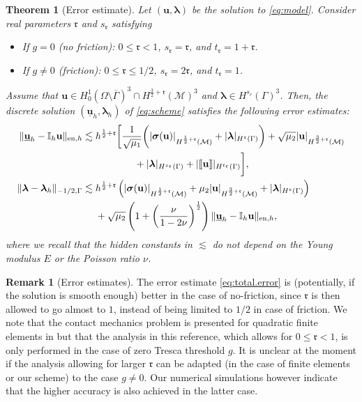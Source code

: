 \documentclass[a4paper,11pt]{article}
\newtheorem{theorem}{Theorem}[section]
\theoremstyle{definition}
\newtheorem{remark}{Remark}[section]
\theoremstyle{remark}
\newcommand{\uvec}[1]{\underline{\mathbf{#1}}}
\newcommand{\bo}[1]{\mathbf{#1}}
\newcommand{\bos}[1]{\boldsymbol{#1}}
\newcommand{\mI}[1]{\mathbb I_h\bo{#1}}
\def\cM{\mathcal{M}}
\def\fr{\mathfrak{r}}
\def\blambda{\boldsymbol{\lambda}}
\def\sjump#1{[\hskip -1.5pt[#1]\hskip -1.5pt]}
\def\O{\Omega}
\begin{document}
\begin{theorem}[Error estimate]\label{thm:error.estimate}
Let $(\bo{u},\blambda)$ be the solution to \eqref{eq:model}. Consider real parameters $\fr$ and $s_{\fr}$ satisfying
\begin{itemize}
\item If $g=0$ (no friction): $0\le \fr<1$, $s_{\fr}=\fr$, and $t_{\fr} =1+\fr$. 

\item If $g\not=0$ (friction): $0\le\fr\le 1/2$, $s_{\fr}=2\fr$, and $t_{\fr}=1$.
\end{itemize}
Assume that $\bo{u}\in H^1_0(\O\setminus\overline{\Gamma})^3\cap H^{\frac{3}{2}+\fr}(\cM)^3$ and $\blambda\in H^{s_r}(\Gamma)^3$. Then, the discrete solution $(\uvec{u}_h,\blambda_h)$ of \eqref{eq:scheme} satisfies the following error estimates:
\begin{align}
\lVert\uvec{u}_h-\mI{u}{}\rVert_{\mathrm{en},h}\lesssim{}& h^{\frac{1}{2}+\fr}\bigg[{}\frac{1}{\sqrt{\mu_{1}}}\bigg(\lvert\bos{\sigma}(\bo{u})\rvert_{H^{\frac{1}{2}+\fr}(\cM)}+\lvert \blambda\rvert_{H^{\fr}(\Gamma)}\bigg)+\sqrt{\mu_{2}}\lvert\bo{u}\rvert_{H^{\frac{3}{2}+\fr}(\cM)}\notag\\
&\qquad\qquad+\lvert \blambda\rvert_{H^{s_\fr}(\Gamma)}+\lvert \sjump{\bo{u}}\rvert_{H^{t_{\fr}}(\Gamma)}\bigg],\label{eq:total.error}\\
\lVert \blambda-\blambda_h\rVert_{-1/2,\Gamma}\lesssim{}&h^{\frac{1}{2}+\fr} \left(\lvert\bos{\sigma}(\bo{u})\rvert_{H^{\frac{1}{2}+\fr}(\cM)}+\mu_2\lvert\bo{u}\rvert_{H^{\frac{3}{2}+\fr}(\cM)}+\lvert \blambda\rvert_{H^{\fr}(\Gamma)}\right){} \notag\\
&+\sqrt{\mu_{2}}\left(1+\left(\frac{\nu}{1-2\nu}\right)^{\frac{1}{2}}\right)\lVert\uvec{u}_h-\mI{u}\rVert_{\mathrm{en},h},\label{eq:total.error_lm}
\end{align}
where we recall that the hidden constants in $\lesssim$ do not depend on the Young modulus $E$ or the Poisson ratio $\nu$.
\end{theorem}

\begin{remark}[Error estimates]\label{rem:error.estimates}
The error estimate \eqref{eq:total.error} is (potentially, if the solution is smooth enough) better in the case of no-friction, since $\fr$ is then allowed to go almost to $1$, instead of being limited to $1/2$ in case of friction. We note that the contact mechanics problem is presented for quadratic finite elements in \cite{wohlmuthquadraticcontact} but that the analysis in this reference, which allows for $0\le \fr<1$, is only performed in the case of zero Tresca threshold $g$. It is unclear at the moment if the analysis allowing for larger $\fr$ can be adapted (in the case of finite elements or our scheme) to the case $g\not=0$. Our numerical simulations however indicate that the higher accuracy is also achieved in the latter case.
\end{remark}
\end{document}
